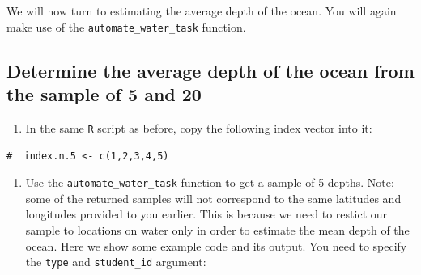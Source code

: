 \documentclass[letterpaper,12pt,twoside,]{pinp}
\providecommand{\tightlist}{%
  \setlength{\itemsep}{0pt}\setlength{\parskip}{0pt}}
\begin{document}
We will now turn to estimating the average depth of the ocean. You will
again make use of the \texttt{automate\_water\_task} function.

\hypertarget{determine-the-average-depth-of-the-ocean-from-the-sample-of-5-and-20}{%
\subsection{Determine the average depth of the ocean from the sample of
5 and
20}\label{determine-the-average-depth-of-the-ocean-from-the-sample-of-5-and-20}}

\begin{enumerate}
\def\labelenumi{\arabic{enumi}.}
\tightlist
\item
  In the same \texttt{R} script as before, copy the following index
  vector into it:
\end{enumerate}

\begin{Shaded}
\begin{Highlighting}[]
\StringTok{ }
\NormalTok{(}\NormalTok{(}\NormalTok{,}\NormalTok{,}
                \OperatorTok{$}
                       \NormalTok{),}
          \NormalTok{, } \NormalTok{))}
\end{Highlighting}
\end{Shaded}

\begin{ShadedResult}
\begin{verbatim}
#  index.n.5 <- c(1,2,3,4,5)
\end{verbatim}
\end{ShadedResult}

\begin{enumerate}
\def\labelenumi{\arabic{enumi}.}
\setcounter{enumi}{1}
\tightlist
\item
  Use the \texttt{automate\_water\_task} function to get a sample of 5
  depths. Note: some of the returned samples will not correspond to the
  same latitudes and longitudes provided to you earlier. This is because
  we need to restict our sample to locations on water only in order to
  estimate the mean depth of the ocean. Here we show some example code
  and its output. You need to specify the \texttt{type} and
  \texttt{student\_id} argument:
\end{enumerate}
\end{document}
